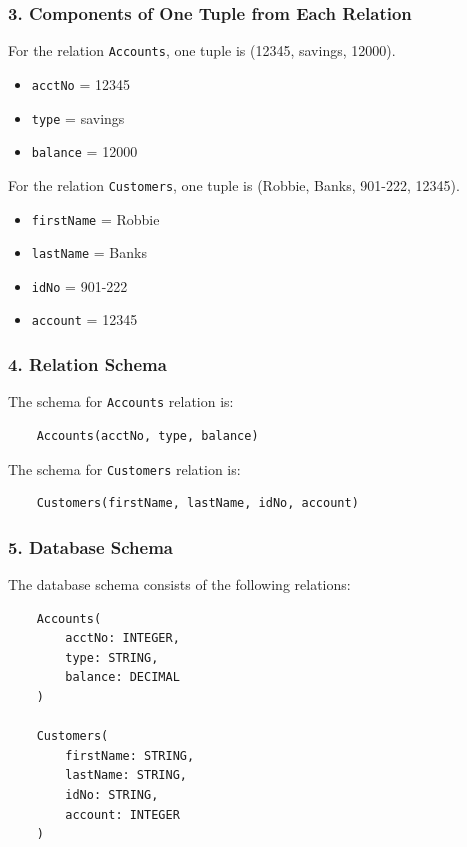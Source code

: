 \documentclass{cshwk}
\begin{document}
\subsubsection*{3. Components of One Tuple from Each Relation}
For the relation \texttt{Accounts}, one tuple is (12345, savings, 12000).
\begin{itemize}
    \item \texttt{acctNo} = 12345
    \item \texttt{type} = savings
    \item \texttt{balance} = 12000
\end{itemize}

\noindent For the relation \texttt{Customers}, one tuple is (Robbie, Banks, 901-222, 12345).
\begin{itemize}
    \item \texttt{firstName} = Robbie
    \item \texttt{lastName} = Banks
    \item \texttt{idNo} = 901-222
    \item \texttt{account} = 12345
\end{itemize}

\subsubsection*{4. Relation Schema}

The schema for \texttt{Accounts} relation is:
\begin{verbatim}
    Accounts(acctNo, type, balance)
\end{verbatim}

\noindent The schema for \texttt{Customers} relation is:
\begin{verbatim}
    Customers(firstName, lastName, idNo, account)
\end{verbatim}

\subsubsection*{5. Database Schema}

The database schema consists of the following relations:

\begin{verbatim}
    Accounts(
        acctNo: INTEGER,
        type: STRING,
        balance: DECIMAL
    )

    Customers(
        firstName: STRING,
        lastName: STRING,
        idNo: STRING,
        account: INTEGER
    )
\end{verbatim}
\end{document}
